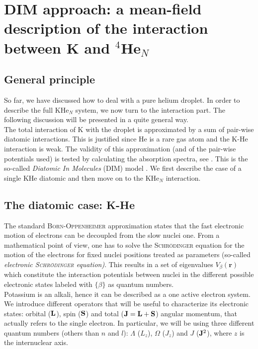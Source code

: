 
\section{DIM approach: a mean-field description of the interaction between K and $^4$He$_N$}

\subsection{General principle}

So far, we have discussed how to deal with a pure helium droplet.
In order to describe the full KHe$_N$ system, we now turn to the interaction part.
The following discussion will be presented in a quite general way.\\

The total interaction of K with the droplet is approximated by a sum of pair-wise diatomic interactions.
This is justified since He is a rare gas atom and the K-He interaction is weak.
The validity of this approximation (and of the pair-wise potentials used) is tested by calculating the absorption spectra, see .
This is the so-called \textit{Diatomic In Molecules} (DIM) model \cite{Ell63}. 
We first describe the case of a single KHe diatomic and then move on to the KHe$_N$ interaction.

\subsection{The diatomic case: K-He}

\label{sec:DIM-dia}
		
The standard \textsc{Born-Oppenheimer} approximation states that the fast electronic motion of electrons can be decoupled from the slow nuclei one. 
From a mathematical point of view, one has to solve the \textsc{Schr\"odinger} equation for the motion of the electrons for fixed nuclei positions treated as parameters (so-called \emph{electronic \textsc{Schr\"odinger} equation)}.
This results in a set of eigenvalues $V_\beta(\textbf{r})$ which constitute the interaction potentials  between nuclei in the different possible electronic states labeled with $\{\beta\}$ as quantum numbers. \\

Potassium is an alkali, hence it can be described as a one active electron system. 
We introduce different operators that will be useful to characterize its electronic states: 
orbital ($\vb{L}$), spin ($\vb{S}$) and total ($\vb{J} = \vb{L}+ \vb{S}$) angular momentum, that actually refers to the single electron.
In particular, we will be using three different quantum numbers (others than $n$ and $l$): $\Lambda$ ($L_z$), $\Omega$ ($J_z$) and $J$ ($\vb{J}^2$), where $z$ is the internuclear axis.\\


